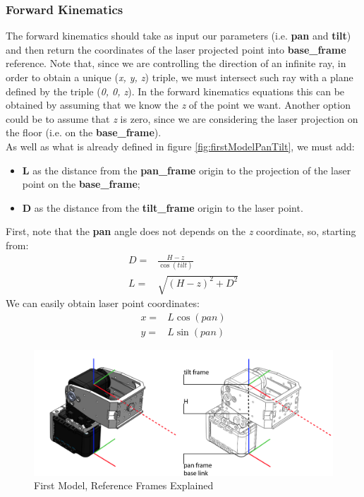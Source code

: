 \subsubsection{Forward Kinematics}
The forward kinematics should take as input our parameters (i.e. \textbf{pan} and \textbf{tilt}) and then return the coordinates of the laser projected point into \textbf{base\_frame} reference. 
Note that, since we are controlling the direction of an infinite ray, in order to obtain a unique (\textit{x, y, z}) triple, we must intersect such ray with a plane defined by the triple (\textit{0, 0, z}). In the forward kinematics equations this can be obtained by assuming that we know the \textit{z} of the point we want. Another option could be to assume that \textit{z} is zero, since we are considering the laser projection on the floor (i.e. on the \textbf{base\_frame}). \\
As well as what is already defined in figure \ref{fig:firstModelPanTilt}, we must add:
\begin{itemize}
    \item \textbf{L} as the distance from the \textbf{pan\_frame} origin to the projection of the laser point on the \textbf{base\_frame};
    \item \textbf{D} as the distance from the \textbf{tilt\_frame} origin to the laser point.
\end{itemize}
First, note that the \textbf{pan} angle does not depends on the \textit{z} coordinate, so, starting from:
\begin{align}
	D=& \frac{H-z}{\cos{(tilt)}} \label{eq:d}\\
	L=& \sqrt{(H-z)^2 + D^2}
\end{align}
We can easily obtain laser point coordinates:
\begin{align}
	x=& L\cos{(pan)}\label{eq:x}\\
	y=& L\sin{(pan)} \label{eq:y}
\end{align}

\begin{figure}
	\centering
	\includegraphics[width=\textwidth]{img/model1Ref.png}%
	\caption{First Model, Reference Frames Explained}
	\label{fig:firstModelRefFrame}
\end{figure}

